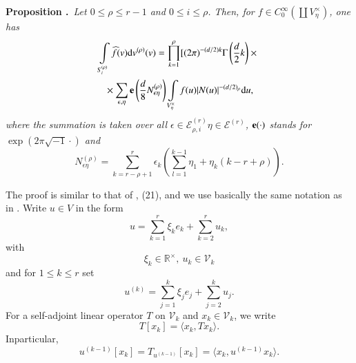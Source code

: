 \medskip
\noindent
{\bf Proposition .\label{art11-prop1}}~{\em Let $0\leq \rho\leq r-1$ and $0\leq i\leq \rho$. Then, for $f\in C_{0}^{\infty}(\coprod V^{\times}_{\eta})$, one has}
\begin{gather*}
\int\limits_{S_{i}^{(\rho)}}\widehat{f}(v)\mathrm{d} v^{(\rho)}(v)=\prod\limits^{\rho}_{k=1}[(2\pi)^{-(d/2)k}\Gamma\left(\dfrac{d}{2}k\right)\times{}\\
{}\times \sum\limits_{\epsilon,\eta}\mathbf{e} \left(\frac{d}{8}N^{(\rho)}_{\epsilon\eta}\right)\int\limits_{V^{\times}_{\eta}}f(u) | N(u)|^{-(d/2)_{\rho}}\mathrm{d} u,
\end{gather*}
{\em where the summation is taken over all $\epsilon\in \mathscr{E}^{(r)}_{\rho,i}\eta\in \mathscr{E}^{(r)}$, $\mathbf{e}(\cdot)$ stands for $\exp(2\pi \sqrt{-1}\cdot)$ and}
$$
N^{(\rho)}_{\epsilon\eta}=\sum\limits^{r}_{k=r-\rho+1}\epsilon_{k}\left(\sum\limits^{k-1}_{l=1}\eta_{1}+\eta_{k}(k-r+\rho)\right).
$$

The proof is similar to that of \cite{art11-keySF}, (21), and we use basically the same notation as in \cite{art11-keySF}. Write $u\in V$ in the form
$$
u=\sum\limits^{r}_{k=1}\xi_{k}e_{k}+\sum\limits^{r}_{k=2}u_{k},
$$
with
$$
\xi_{k}\in \mathbb{R}^{\times}, \ u_{k}\in \mathscr{V}_{k}
$$
and for $1\leq k\leq r$ set
$$
u^{(k)}=\sum\limits^{k}_{j=1}\xi_{j}e_{j}+\sum\limits^{k}_{j=2}u_{j}.
$$
For a self-adjoint linear operator $T$ on $\mathscr{V}_{k}$ and $x_{k}\in \mathscr{V}_{k}$, we write
$$
T[x_{k}]=\langle x_{k}, Tx_{k}\rangle.
$$
In\pageoriginale particular,
$$
u^{(k-1)}[x_{k}]=T_{u^{(k-1)}}[x_{k}]=\langle x_{k},u^{(k-1)}x_{k}\rangle.
$$

